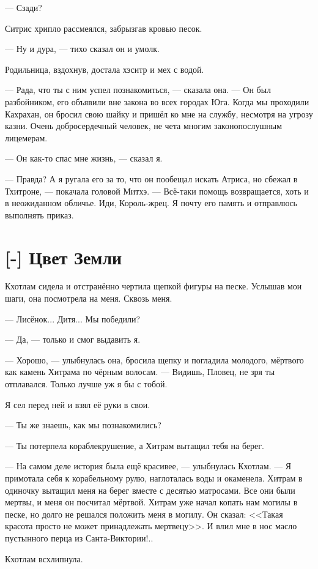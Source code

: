 --- Сзади?

Ситрис хрипло рассмеялся, забрызгав кровью песок.

--- Ну и дура, --- тихо сказал он и умолк.

Родильница, вздохнув, достала хэситр и мех с водой.

--- Рада, что ты с ним успел познакомиться, --- сказала она.
--- Он был разбойником, его объявили вне закона во всех городах Юга.
Когда мы проходили Кахрахан, он бросил свою шайку и пришёл ко мне на службу, несмотря на угрозу казни.
Очень добросердечный человек, не чета многим законопослушным лицемерам.

--- Он как-то спас мне жизнь, --- сказал я.

--- Правда?
А я ругала его за то, что он пообещал искать Атриса, но сбежал в Тхитроне, --- покачала головой Митхэ.
--- Всё-таки помощь возвращается, хоть и в неожиданном обличье.
Иди, Король-жрец.
Я почту его память и отправлюсь выполнять приказ.

\section{[-] Цвет Земли}

Кхотлам сидела и отстранённо чертила щепкой фигуры на песке.
Услышав мои шаги, она посмотрела на меня.
Сквозь меня.

--- Лисёнок...
Дитя...
Мы победили?

--- Да, --- только и смог выдавить я.

--- Хорошо, --- улыбнулась она, бросила щепку и погладила молодого, мёртвого как камень Хитрама по чёрным волосам.
--- Видишь, Пловец, не зря ты отплавался.
Только лучше уж я бы с тобой.

Я сел перед ней и взял её руки в свои.

--- Ты же знаешь, как мы познакомились?

--- Ты потерпела кораблекрушение, а Хитрам вытащил тебя на берег.

--- На самом деле история была ещё красивее, --- улыбнулась Кхотлам.
--- Я примотала себя к корабельному рулю, наглоталась воды и окаменела.
Хитрам в одиночку вытащил меня на берег вместе с десятью матросами.
Все они были мертвы, и меня он посчитал мёртвой.
Хитрам уже начал копать нам могилы в песке, но долго не решался положить меня в могилу.
Он сказал: <<Такая красота просто не может принадлежать мертвецу>>.
И влил мне в нос масло пустынного перца из Санта-Виктории!..

Кхотлам всхлипнула.

